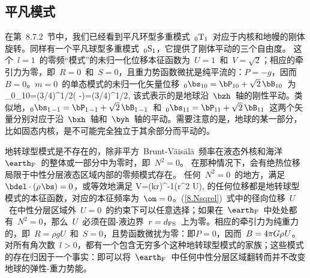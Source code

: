 \renewcommand{\thesubsection}{$\!\!\!\raise1.3ex\hbox{$\star$}\!\!$
\arabic{chapter}.\arabic{section}.\arabic{subsection}}
\subsection{平凡模式}
%
%
\renewcommand{\thesubsection}{\arabic{chapter}.\arabic{section}.\arabic{subsection}}

在第~8.7.2~节中，我们已经看到平凡环型多重模式~${}_0{\rm T}_1$~对应于内核和地幔的刚体旋转。同样有一个平凡球型多重模式~${}_0{\rm S}_1$，它提供了刚体平动的三个自由度。
%
%
这个~$l=1$~的零频“模式”的未归一化位移本征函数为~$U=1$~和~$V=\sqrt{2}$；相应的牵引力为零，即~$R=0$~和~$S=0$，且重力势函数微扰是纯平流的：$P=-g$，因而~$B=0$。$m=0$~的单态模式的未归一化矢量位移~${}_0\bs_{10}=\bP_{10}+\sqrt{2}\,\bB_{10}$~为
\eq
{}_0\bs_{10}=(3/4\pi)^{1/2}(\brh\cos\theta
-\bthetah\sin\theta)=(3/4\pi)^{1/2}\bzh,
\en
该式表示的是地球沿~$\bzh$~轴的刚性平动。类似地，${}_0\bs_{1\,-1}=\bP_{1\,-1}+\sqrt{2}\,\bB_{1\,-1}$~和~${}_0\bs_{11}=\bP_{11}+\sqrt{2}\,\bB_{11}$~这两个矢量分别对应于沿~$\bxh$~轴和~$\byh$~轴的平动。需要注意的是，地球的某一部分，比如固态内核，是不可能完全独立于其余部分而平动的。

地转球型模式是不存在的，除非平方~Brunt-V\"{a}is\"{a}l\"{a}~频率在液态外核和海洋~$\earth_{\rm F}$~的整体或一部分中为零时，即~$N^2=0$。
%
%
在那种情况下，会有绝热位移局限于中性分层液态区域内部的零频模式存在。
%
%
任何~$N^2=0$~的地方，满足~$\bdel\cdot(\rho\hspace{0.3 mm}\bs)=0$，或等效地满足
\eq \label{8.Nsqrel}
V=(k\rho r)^{-1}(\rho r^2 U),
\en
的任何位移都是地转球型模式的本征函数，对应的本征频率为~$\om=0$。(\ref{8.Nsqrel})~式中的径向位移~$U$~在中性分层区域外~$U=0$~的约束下可以任意选择；如果在~$\earth_{\rm F}$~中处处都有~$N^2=0$，那么~$U$~必须在固-液边界~$r=d_{\rm FS}$~上为零。相应的牵引力为纯重力的，即~$R=\rho gU$~和~$S=0$，且势函数微扰为零：即$P=0$，因而~$B=4\pi G\rho\hspace{0.2 mm}U$。对所有角次数~$l>0$，都有一个包含无穷多个这种地转球型模式的家族；这些模式的存在归因于一个事实：即可以将~$\earth_{\rm F}$~中任何中性分层区域翻转而并不改变地球的弹性-重力势能。
%
%


